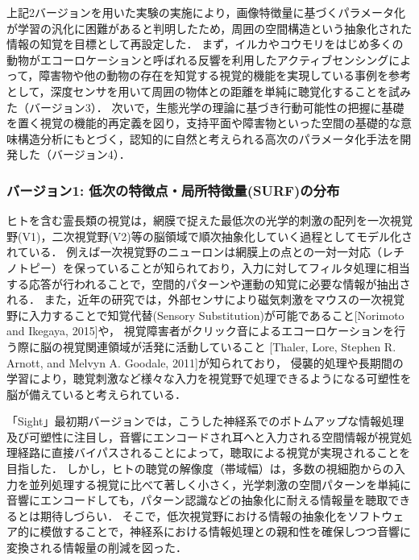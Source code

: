 上記2バージョンを用いた実験の実施により，画像特徴量に基づくパラメータ化が学習の汎化に困難があると判明したため，周囲の空間構造という抽象化された情報の知覚を目標として再設定した．
まず，イルカやコウモリをはじめ多くの動物がエコーロケーションと呼ばれる反響を利用したアクティブセンシングによって，障害物や他の動物の存在を知覚する視覚的機能を実現している事例を参考として，深度センサを用いて周囲の物体との距離を単純に聴覚化することを試みた（バージョン3）．
次いで，生態光学の理論に基づき行動可能性の把握に基礎を置く視覚の機能的再定義を図り，支持平面や障害物といった空間の基礎的な意味構造分析にもとづく，認知的に自然と考えられる高次のパラメータ化手法を開発した（バージョン4）．

\subsubsection{バージョン1: 低次の特徴点・局所特徴量(SURF)の分布}

ヒトを含む霊長類の視覚は，網膜で捉えた最低次の光学的刺激の配列を一次視覚野(V1)，二次視覚野(V2)等の脳領域で順次抽象化していく過程としてモデル化されている．
例えば一次視覚野のニューロンは網膜上の点との一対一対応（レチノトピー）を保っていることが知られており，入力に対してフィルタ処理に相当する応答が行われることで，空間的パターンや運動の知覚に必要な情報が抽出される．
また，近年の研究では，外部センサにより磁気刺激をマウスの一次視覚野に入力することで知覚代替(Sensory Substitution)が可能であること[Norimoto and Ikegaya, 2015]や，
視覚障害者がクリック音によるエコーロケーションを行う際に脳の視覚関連領域が活発に活動していること
[Thaler, Lore, Stephen R. Arnott, and Melvyn A. Goodale, 2011]が知られており，
侵襲的処理や長期間の学習により，聴覚刺激など様々な入力を視覚野で処理できるようになる可塑性を脳が備えていると考えられている．

「Sight」最初期バージョンでは，こうした神経系でのボトムアップな情報処理及び可塑性に注目し，音響にエンコードされ耳へと入力される空間情報が視覚処理経路に直接バイパスされることによって，聴取による視覚が実現されることを目指した．
しかし，ヒトの聴覚の解像度（帯域幅）は，多数の視細胞からの入力を並列処理する視覚に比べて著しく小さく，光学刺激の空間パターンを単純に音響にエンコードしても，パターン認識などの抽象化に耐える情報量を聴取できるとは期待しづらい．
そこで，低次視覚野における情報の抽象化をソフトウェア的に模倣することで，神経系における情報処理との親和性を確保しつつ音響に変換される情報量の削減を図った．

